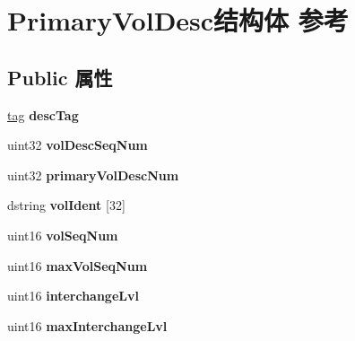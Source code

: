 \hypertarget{struct_primary_vol_desc}{}\section{Primary\+Vol\+Desc结构体 参考}
\label{struct_primary_vol_desc}
\subsection*{Public 属性}
\begin{DoxyCompactItemize}
\item 
\mbox{\label{struct_primary_vol_desc_af17c4f09171c6e7aa1afb02551b3640e}} 
\hyperlink{structtag}{tag} {\bfseries desc\+Tag}
\item 
\mbox{\label{struct_primary_vol_desc_a9842d8a0f1579891ea7c0e4b558ad5ce}} 
uint32 {\bfseries vol\+Desc\+Seq\+Num}
\item 
\mbox{\label{struct_primary_vol_desc_a76e6131619a226813ce88dfc0fff19b4}} 
uint32 {\bfseries primary\+Vol\+Desc\+Num}
\item 
\mbox{\label{struct_primary_vol_desc_ab2f13a0cbf84c2d2eb8b9873bf820123}} 
dstring {\bfseries vol\+Ident} \mbox{[}32\mbox{]}
\item 
\mbox{\label{struct_primary_vol_desc_a5aa2da783723f73da82fb2527319cb2a}} 
uint16 {\bfseries vol\+Seq\+Num}
\item 
\mbox{\label{struct_primary_vol_desc_ae647801caa0517858fecfb818ba7bfb9}} 
uint16 {\bfseries max\+Vol\+Seq\+Num}
\item 
\mbox{\label{struct_primary_vol_desc_a936a1116d41c8c596a1106e4d8313c2f}} 
uint16 {\bfseries interchange\+Lvl}
\item 
\mbox{\label{struct_primary_vol_desc_a0b5943cdfd088b6222a9e7d7154614da}} 
uint16 {\bfseries max\+Interchange\+Lvl}
\item 
\mbox{\label{struct_primary_vol_desc_a13927cec2332a0af424c2b72791499ce}} 

\end{DoxyCompactItemize}

